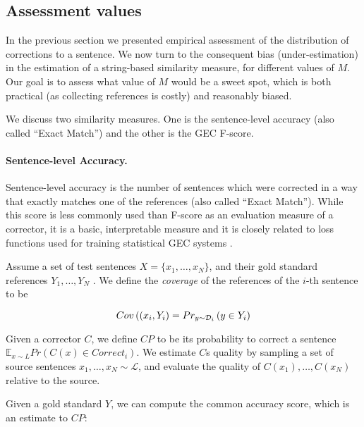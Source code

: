 		\subsection{Assessment values} \label{subsec:Assessment-values}
		
		In the previous section we presented empirical assessment of the distribution of
		corrections to a sentence. We now turn to the consequent bias (under-estimation) in the estimation of a string-based similarity measure, for different values of $M$. Our goal is to assess what value of $M$ would be a sweet spot, which is both practical (as collecting references is costly) and reasonably biased.
		
		We discuss two similarity measures. One is the sentence-level accuracy (also called ``Exact Match'') and the other is the GEC F-score.
		
		\paragraph{Sentence-level Accuracy.}
		Sentence-level accuracy is the number of sentences which were corrected in a way that exactly matches one of the
		references (also called ``Exact Match''). While this score is less commonly used than F-score as an evaluation
		measure of a corrector, it is a basic, interpretable measure and it is closely related to loss functions used for
		training statistical GEC systems \cite{rozovskaya2010training,chodorow2012problems,rozovskaya2013joint}. 
		
		Assume a set of test sentences $X=\{x_1,\ldots,x_N\}$,
		and their gold standard references $Y_1,\ldots,Y_N$ . We define the
		{\it coverage} of the references of the $i$-th sentence to be
		
		\begin{equation}
		\footnotesize
		Cov\left((x_i,Y_i\right)=Pr_{y \sim \mathcal{D}_i}\left(y \in Y_i\right)
		\end{equation}
		
		Given a corrector $C$, we define $CP$ to be its probability to correct a sentence $\mathbb{E}_{x\sim{L}}Pr\left(C\left(x\right)\in Correct_i\right)$. We estimate $C$s quality by sampling a set of source sentences
		$x_1,\ldots,x_N \sim \mathcal{L}$, and evaluate the quality of $C(x_1),\ldots,C(x_N)$ relative
		to the source. 
		
		Given a gold standard $Y$, we can compute the common accuracy score, which is an estimate to $CP$:
		
